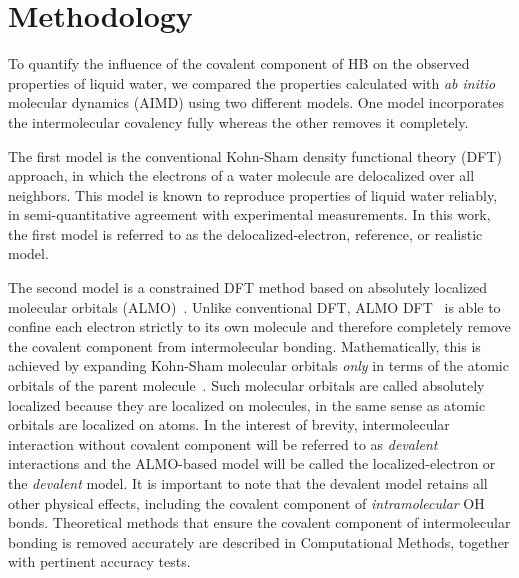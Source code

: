 \documentclass[aps,prl,reprint,amsmath,amssymb]{revtex4-1}
\begin{document}

\section{Methodology}

To quantify the influence of the covalent component of HB on the observed properties of liquid water, we compared the properties calculated with \emph{ab initio} molecular dynamics (AIMD) using two different models. 
One model incorporates the intermolecular covalency fully whereas the other removes it completely.

The first model is the conventional Kohn-Sham density functional theory (DFT) approach, in which the electrons of a water molecule are delocalized over all neighbors. 
This model is known to reproduce properties of liquid water reliably, in semi-quantitative agreement with experimental measurements. 
In this work, the first model is referred to as the delocalized-electron, reference, or realistic model. 

The second model is a constrained DFT method based on absolutely localized molecular orbitals (ALMO)~\cite{khaliullin2006efficient}. 
Unlike conventional DFT, ALMO DFT~\cite{Khaliullin2013JCTC} is able to confine each electron strictly to its own molecule and therefore completely remove the covalent component from intermolecular bonding. 
Mathematically, this is achieved by expanding Kohn-Sham molecular orbitals \emph{only} in terms of the atomic orbitals of the parent molecule~\cite{stoll1980use,khaliullin2006efficient, mo2000energy}.
Such molecular orbitals are called absolutely localized because they are localized on molecules, in the same sense as atomic orbitals are localized on atoms. 
In the interest of brevity, intermolecular interaction without covalent component will be referred to as \emph{devalent} interactions and the ALMO-based model will be called the localized-electron or the \emph{devalent} model. 
It is important to note that the devalent model retains all other physical effects, including the covalent component of \emph{intramolecular} OH bonds. %
Theoretical methods that ensure the covalent component of intermolecular bonding is removed accurately are described in Computational Methods, together with pertinent accuracy tests.
\end{document}

